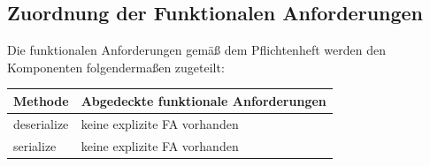 \subsection{Zuordnung der Funktionalen Anforderungen}

Die funktionalen Anforderungen gemäß dem Pflichtenheft werden den Komponenten folgendermaßen zugeteilt:


\begin{table}[h]
	\centering
	\begin{tabular}{|l|l|}
    	\hline
    	\textbf{Methode} & \textbf{Abgedeckte funktionale Anforderungen}\\ \hline
    	deserialize & keine explizite FA vorhanden  \\ \hline
    	serialize & keine explizite FA vorhanden \\ \hline


	\end{tabular}
\end{table}